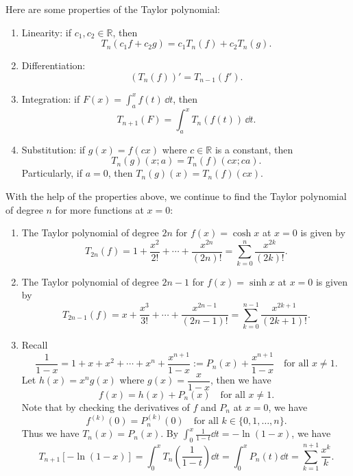     \begin{theoremenv}
        Here are some properties of the Taylor polynomial:
        \begin{enumerate}[label=(\arabic*)]
            \item Linearity: if $c_1,c_2 \in \mathbb R$, then $$T_n(c_1 f + c_2 g) = c_1 T_n(f) + c_2 T_n(g).$$
            \item Differentiation: $$(T_n(f))' = T_{n-1}(f').$$
            \item Integration: if $\displaystyle F(x)=\int_a^x f(t)\, \dd t$, then \[T_{n+1}(F) = \int_a^x T_n(f(t))\, \dd t.\]
            \item Substitution: if $g(x)=f(cx)$ where $c\in \mathbb R$ is a constant, then \[T_n(g)(x;a) = T_n(f)(cx; ca).\]
            Particularly, if $a=0$, then $T_n(g)(x) = T_n(f)(cx)$.
        \end{enumerate}
    \end{theoremenv}
    \begin{exampleenv}
        With the help of the properties above, we continue to find the Taylor polynomial of degree $n$ for more functions at $x=0$:
        \begin{enumerate}[label=(\arabic*),start=4]
            \item The Taylor polynomial of degree $2n$ for $f(x)=\cosh x$ at $x=0$ is given by
            \[
            T_{2n}(f) = 1 + \frac{x^2}{2!} + \cdots + \frac{x^{2n}}{(2n)!} = \sum_{k=0}^n \frac{x^{2k}}{(2k)!}.
            \]
            \item The Taylor polynomial of degree $2n-1$ for $f(x)=\sinh x$ at $x=0$ is given by
            \[
            T_{2n-1}(f) = x + \frac{x^3}{3!} + \cdots + \frac{x^{2n-1}}{(2n-1)!} = \sum_{k=0}^{n-1} \frac{x^{2k+1}}{(2k+1)!}.
            \]
            \item Recall
            \[
            \frac1{1-x} = 1 + x + x^2 + \cdots + x^n + \frac{x^{n+1}}{1-x}:=P_n(x)+\frac{x^{n+1}}{1-x} \quad \text{for all } x\neq 1.
            \]
            Let $h(x) = x^n g(x)$ where $g(x) = \dfrac{x}{1-x}$, then we have
            \[
            f(x)=h(x) + P_n(x) \quad \text{for all } x\neq 1.
            \]
            Note that by checking the derivatives of $f$ and $P_n$ at $x=0$, we have
            \[
            f^{(k)}(0) = P_n^{(k)}(0) \quad \text{for all } k\in \{0,1,\ldots,n\}.
            \]
            Thus we have $T_n(x) = P_n(x)$. By $\displaystyle \int_0^x \frac{1}{1-t} \dd t = -\ln(1-x)$, we have
            \[
            T_{n+1}\left[ -\ln(1-x) \right] = \int_0^x T_n\left( \frac{1}{1-t} \right) \dd t = \int_0^x P_n(t) \dd t = \sum_{k=1}^{n+1} \frac{x^k}{k}.
            \]
        \end{enumerate}
    \end{exampleenv}
